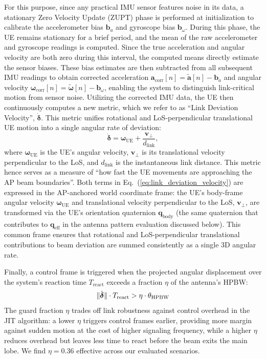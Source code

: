 \documentclass[fleqn,10pt]{wlscirep}
\newcommand{\rev}[1]{{\color{revblue}#1}}
\begin{document}
For this purpose, since any practical IMU sensor features noise in its data, a stationary Zero Velocity Update (ZUPT) phase is performed at initialization to calibrate the accelerometer bias $\mathbf{b}_a$ and gyroscope bias $\mathbf{b}_\omega$. During this phase, the UE remains stationary for a brief period, and the mean of the raw accelerometer and gyroscope readings is computed. Since the true acceleration and angular velocity are both zero during this interval, the computed means directly estimate the sensor biases. These bias estimates are then subtracted from all subsequent IMU readings to obtain corrected acceleration $\mathbf{a}_{\text{corr}}[n] = \tilde{\mathbf{a}}[n] - \mathbf{b}_a$ and angular velocity $\boldsymbol{\omega}_{\text{corr}}[n] = \tilde{\boldsymbol{\omega}}[n] - \mathbf{b}_\omega$, enabling the system to distinguish link-critical motion from sensor noise. Utilizing the corrected IMU data, the UE then continuously computes a new metric, which we refer to as ``Link Deviation Velocity'', $\dot{\boldsymbol{\delta}}$. This metric unifies rotational and LoS-perpendicular translational UE motion into a single angular rate of deviation:
\begin{equation}
    \dot{\boldsymbol{\delta}} = \boldsymbol{\omega}_{\text{UE}} + \frac{\mathbf{v}_{\perp}}{d_{\text{link}}},
    \label{eq:link_deviation_velocity}
\end{equation}
where $\boldsymbol{\omega}_{\text{UE}}$ is the UE's angular velocity, $\mathbf{v}_{\perp}$ is its translational velocity perpendicular to the LoS, and $d_{\text{link}}$ is the instantaneous link distance. This metric hence serves as a measure of ``how fast the UE movements are approaching the AP beam boundaries''. \rev{Both terms in Eq.~(\ref{eq:link_deviation_velocity}) are expressed in the AP-anchored world coordinate frame: the UE's body-frame angular velocity $\boldsymbol{\omega}_{\text{UE}}$ and translational velocity perpendicular to the LoS, $\mathbf{v}_{\perp}$, are transformed via the UE's orientation quaternion $\mathbf{q}_{\text{body}}$ (the same quaternion that contributes to $\mathbf{q}_{\text{eff}}$ in the antenna pattern evaluation discussed below). This common frame ensures that rotational and LoS-perpendicular translational contributions to beam deviation are summed consistently as a single 3D angular rate.}

Finally, a control frame is triggered when the projected angular displacement over the system's reaction time $T_{\text{react}}$ exceeds a fraction $\eta$ of the antenna's HPBW:
\begin{equation}
    \|\dot{\boldsymbol{\delta}}\| \cdot T_{\text{react}} > \eta \cdot \theta_{\text{HPBW}}
    \rev{\label{eq:trigger}}
\end{equation}
The guard fraction $\eta$ trades off link robustness against control overhead in the JIT algorithm: a lower $\eta$ triggers control frames earlier, providing more margin against sudden motion at the cost of higher signaling frequency, while a higher $\eta$ reduces overhead but leaves less time to react before the beam exits the main lobe. We find $\eta = 0.36$ effective across our evaluated scenarios.
\end{document}
